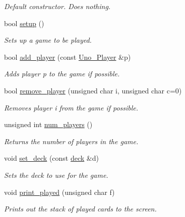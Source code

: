 \begin{DoxyCompactItemize}
\begin{DoxyCompactList}\small\item\em \-Default constructor. \-Does nothing. \end{DoxyCompactList}\item 
bool \hyperlink{class_uno___runner_ae015517f7d4493ddbaaeacd98be0b9b8}{setup} ()
\begin{DoxyCompactList}\small\item\em \-Sets up a game to be played. \end{DoxyCompactList}\item 
bool \hyperlink{class_uno___runner_a982f614c5afa8faa57aedc3116f3d237}{add\-\_\-player} (const \hyperlink{class_uno___player}{\-Uno\-\_\-\-Player} \&p)
\begin{DoxyCompactList}\small\item\em \-Adds player p to the game if possible. \end{DoxyCompactList}\item 
bool \hyperlink{class_uno___runner_acae1277934b338e4c6edd8d45eea5a3e}{remove\-\_\-player} (unsigned char i, unsigned char c=0)
\begin{DoxyCompactList}\small\item\em \-Removes player i from the game if possible. \end{DoxyCompactList}\item 
unsigned int \hyperlink{class_uno___runner_aa3f43b6ab9042ff74a34ad3fae8a0b11}{num\-\_\-players} ()
\begin{DoxyCompactList}\small\item\em \-Returns the number of players in the game. \end{DoxyCompactList}\item 
void \hyperlink{class_uno___runner_a2ca7c819e3fc8774853cc5a49333eeb9}{set\-\_\-deck} (const \hyperlink{uno__deck_8h_ab634a15f4d19d3af113a71241b79c408}{deck} \&d)
\begin{DoxyCompactList}\small\item\em \-Sets the deck to use for the game. \end{DoxyCompactList}\item 
void \hyperlink{class_uno___runner_a885e7ac58c656e1cb0bc4e49cd494874}{print\-\_\-played} (unsigned char f)
\begin{DoxyCompactList}\small\item\em \-Prints out the stack of played cards to the screen. \end{DoxyCompactList}\item 

\end{DoxyCompactItemize}
